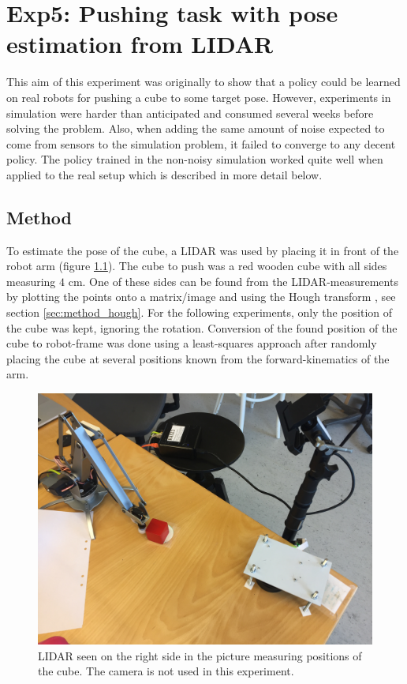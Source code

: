 \chapter{Exp5: Pushing task with pose estimation from LIDAR}

This aim of this experiment was originally to show that a policy could be
learned on real robots for pushing a cube to some target pose. However,
experiments in simulation were harder than anticipated and consumed several
weeks before solving the problem. Also, when adding the same amount of noise
expected to come from sensors to the simulation problem, it failed to converge
to any decent policy. The policy trained in the non-noisy simulation worked
quite well when applied to the real setup which is described in more detail
below.

\section{Method}

To estimate the pose of the cube, a LIDAR was used by placing it in front of
the robot arm (figure \ref{fig:eef-frame}). The cube to push was a red wooden
cube with all sides measuring $4$ cm. One of these sides can be found from the
LIDAR-measurements by plotting the points onto a matrix/image and using the
Hough transform \cite{duda1972use}, see section \ref{sec:method_hough}. For the following experiments, only the
position of the cube was kept, ignoring the rotation. Conversion of the found
position of the cube to robot-frame was done using a least-squares approach
after randomly placing the cube at several positions known from the
forward-kinematics of the arm.

\begin{figure}[h!]
    \centering
    \includegraphics[width=0.48 \textwidth]{res/camera_placement_fixed.jpg}

    \caption{LIDAR seen on the right side in the picture measuring positions of
    the cube. The camera is not used in this experiment.}

    \label{fig:eef-frame}
    
\end{figure}

